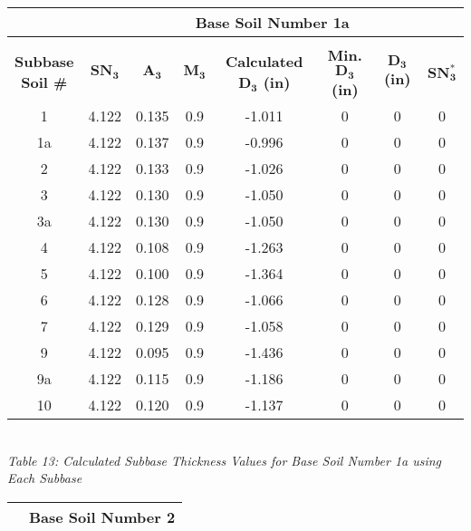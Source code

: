 \documentclass{article}
\begin{document}
\begin{center}
\begin{spacing}{1.6}
        \newpage
        \begin{tabular}{|c|ccccccc|}
            \hline    
            \multicolumn{1}{|l}{}                     & \multicolumn{7}{c|}{\textbf{Base Soil Number 1a}}                                              \\\hline
            &&&&&&&\\
             \shortstack[c]{\textbf{Subbase}\\\textbf{Soil \#}} & $\bm{SN_3}$ & $\bm{A_3}$ & $\bm{M_3}$ & \textbf{Calculated $\bm{D_3}$ (in)} & \textbf{Min. $\bm{D_3}$ (in)} & \textbf{$\bm{D_3}$ (in)} & $\bm{SN_3^*}$  \\\hline
             1  & 4.122 & 0.135 & 0.9 & -1.011 & 0 & 0&0  \\
             1a & 4.122 & 0.137 & 0.9 & -0.996 & 0 & 0&0  \\
             2  & 4.122 & 0.133 & 0.9 & -1.026 & 0 & 0&0  \\
             3  & 4.122 & 0.130 & 0.9 & -1.050 & 0 & 0&0  \\
             3a & 4.122 & 0.130 & 0.9 & -1.050 & 0 & 0&0  \\
             4  & 4.122 & 0.108 & 0.9 & -1.263 & 0 & 0&0  \\
             5  & 4.122 & 0.100 & 0.9 & -1.364 & 0 & 0&0  \\
             6  & 4.122 & 0.128 & 0.9 & -1.066 & 0 & 0&0  \\
             7  & 4.122 & 0.129 & 0.9 & -1.058 & 0 & 0&0  \\
             9  & 4.122 & 0.095 & 0.9 & -1.436 & 0 & 0&0  \\
             9a & 4.122 & 0.115 & 0.9 & -1.186 & 0 & 0&0  \\
             10 & 4.122 & 0.120 & 0.9 & -1.137 & 0 & 0&0\\\hline
        \end{tabular}
        \vspace{3mm}
        \emph{\\Table 13: Calculated Subbase Thickness Values for Base Soil Number 1a using Each Subbase\\}
        \vspace{7mm}
        \begin{tabular}{|c|ccccccc|}
            \hline    
            \multicolumn{1}{|l}{}                     & \multicolumn{7}{c|}{\textbf{Base Soil Number 2}}                                              \\\hline

\end{tabular}
\end{spacing}
\end{center}
\end{document}
